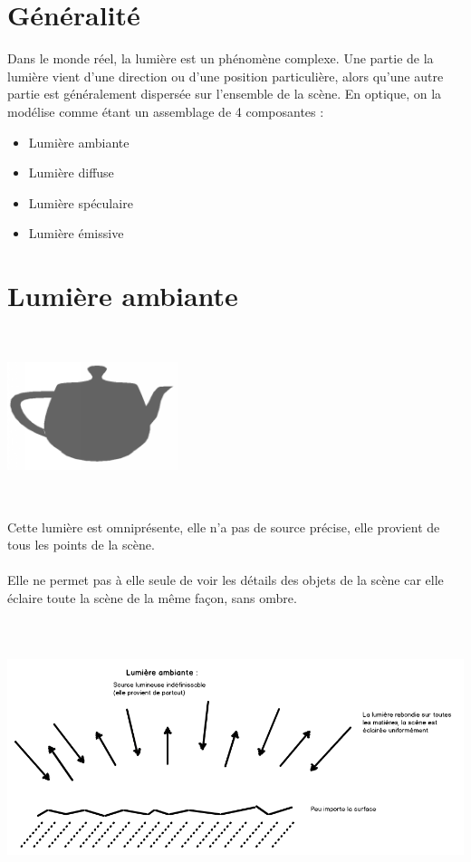 \section{Généralité}
Dans le monde réel, la lumière est un phénomène complexe.
Une partie de la lumière vient d’une direction ou d’une position particulière, alors
qu’une autre partie est généralement dispersée sur l’ensemble de la scène. En optique, on la modélise comme étant un assemblage de 4 composantes :
\begin{itemize}
\item Lumière ambiante
\item Lumière diffuse
\item Lumière spéculaire
\item Lumière émissive
\end{itemize}

\section{Lumière ambiante}
\begin{center}
\includegraphics[width=5cm,height=5cm]{pipeline/images/objet_ambiante.png}
\end{center}

Cette lumière est omniprésente, elle n'a pas de source précise, elle provient de tous les points de la scène.
\\\\
Elle ne permet pas à elle seule de voir les détails des objets de la scène car elle éclaire toute la scène de la même façon, sans ombre.
\\\\
\begin{center}
\includegraphics[width=17cm,height=7cm]{pipeline/images/lumiere_ambiante.png}
\end{center}

